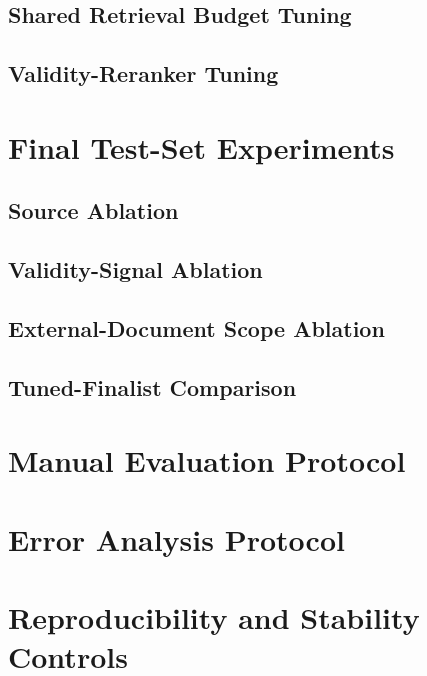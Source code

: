\subsection{Shared Retrieval Budget Tuning}
\label{sec:shared-retrieval-budget-tuning}

\subsection{Validity-Reranker Tuning}
\label{sec:validity-reranker-tuning}

\section{Final Test-Set Experiments}
\label{sec:final-test-set-experiments}

\subsection{Source Ablation}
\label{sec:source-ablation}

\subsection{Validity-Signal Ablation}
\label{sec:validity-signal-ablation}

\subsection{External-Document Scope Ablation}
\label{sec:external-document-scope-ablation}

\subsection{Tuned-Finalist Comparison}
\label{sec:tuned-finalist-comparison}

\section{Manual Evaluation Protocol}
\label{sec:manual-evaluation-protocol}

\section{Error Analysis Protocol}
\label{sec:error-analysis-protocol}

\section{Reproducibility and Stability Controls}
\label{sec:reproducibility-stability-controls}